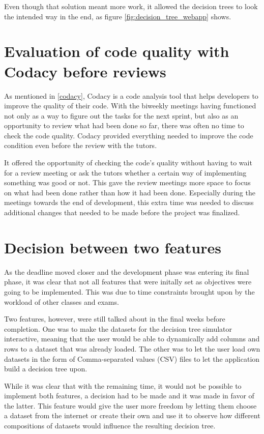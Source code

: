 Even though that solution meant more work, it allowed the decision trees to look the intended way in the end, as figure \ref{fig:decision_tree_webapp} shows.

\section{Evaluation of code quality with Codacy before reviews}
As mentioned in \ref{codacy}, Codacy is a code analysis tool that helps developers to improve the quality of their code. With the biweekly meetings having functioned not only as a way to figure out the tasks for the next sprint, but also as an opportunity to review what had been done so far, there was often no time to check the code quality. Codacy provided everything needed to improve the code condition even before the review with the tutors.

It offered the opportunity of checking the code's quality without having to wait for a review meeting or ask the tutors whether a certain way of implementing something was good or not.
This gave the review meetings more space to focus on what had been done rather than how it had been done. Especially during the meetings towards the end of development, this extra time was needed to discuss additional changes that needed to be made before the project was finalized.

\section{Decision between two features}
As the deadline moved closer and the development phase was entering its final phase, it was clear that not all features that were initally set as objectives were going to be implemented. This was due to time constraints brought upon by the workload of other classes and exams.

Two features, however, were still talked about in the final weeks before completion. One was to make the datasets for the decision tree simulator interactive, meaning that the user would be able to dynamically add columns and rows to a dataset that was already loaded. The other was to let the user load own datasets in the form of Comma-separated values (CSV) files to let the application build a decision tree upon.

While it was clear that with the remaining time, it would not be possible to implement both features, a decision had to be made and it was made in favor of the latter. This feature would give the user more freedom by letting them choose a dataset from the internet or create their own and use it to observe how different compositions of datasets would influence the resulting decision tree.

